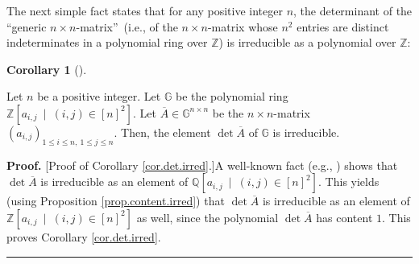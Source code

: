 \documentclass[numbers=enddot,12pt,final,onecolumn,notitlepage]{scrartcl}%
\theoremstyle{definition}
\newtheorem{coro}[theo]{Corollary}
\newenvironment{corollary}[1][]
{\begin{coro}[#1]\begin{leftbar}}
{\end{leftbar}\end{coro}}
\newenvironment{proof}[1][Proof]{\noindent\textbf{#1.} }{\ \rule{0.5em}{0.5em}}
\begin{document}
The next simple fact states that for any positive integer $n$, the determinant
of the \textquotedblleft generic $n\times n$-matrix\textquotedblright\ (i.e.,
of the $n\times n$-matrix whose $n^{2}$ entries are distinct indeterminates in
a polynomial ring over $\mathbb{Z}$) is irreducible as a polynomial over
$\mathbb{Z}$:

\begin{corollary}
\label{cor.det.irred}Let $n$ be a positive integer. Let $\mathbb{G}$ be the
polynomial ring $\mathbb{Z}\left[  a_{i,j}\ \mid\ \left(  i,j\right)
\in\left[  n\right]  ^{2}\right]  $. Let $\overline{A}\in\mathbb{G}^{n\times
n}$ be the $n\times n$-matrix $\left(  a_{i,j}\right)  _{1\leq i\leq n,\ 1\leq
j\leq n}$. Then, the element $\det\overline{A}$ of $\mathbb{G}$ is irreducible.
\end{corollary}

\begin{proof}
[Proof of Corollary \ref{cor.det.irred}.]A well-known fact (e.g., \cite[Lemma
5.12]{DeKuRo78}) shows that $\det\overline{A}$ is irreducible as an element of
$\mathbb{Q}\left[  a_{i,j}\ \mid\ \left(  i,j\right)  \in\left[  n\right]
^{2}\right]  $. This yields (using Proposition \ref{prop.content.irred}) that
$\det\overline{A}$ is irreducible as an element of $\mathbb{Z}\left[
a_{i,j}\ \mid\ \left(  i,j\right)  \in\left[  n\right]  ^{2}\right]  $ as
well, since the polynomial $\det\overline{A}$ has content $1$. This proves
Corollary \ref{cor.det.irred}.
\end{proof}
\end{document}
